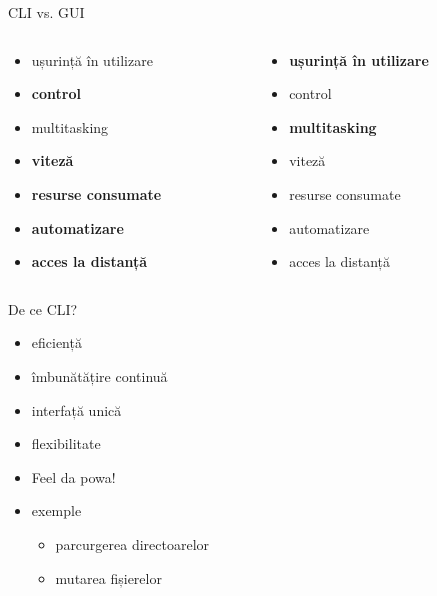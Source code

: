 \documentclass{beamer}
\begin{document}
\begin{frame}{CLI vs. GUI}
	\begin{columns}
		\begin{column}[l]{0.5\textwidth}
			\begin{itemize}
				\item ușurință în utilizare
				\item \textbf{control}
				\item multitasking
				\item \textbf{viteză}
				\item \textbf{resurse consumate}
				\item \textbf{automatizare}
				\item \textbf{acces la distanță}
			\end{itemize}
		\end{column}
		\begin{column}[l]{0.5\textwidth}
			\begin{itemize}
				\item \textbf{ușurință în utilizare}
				\item control
				\item \textbf{multitasking}
				\item viteză
				\item resurse consumate
				\item automatizare
				\item acces la distanță
			\end{itemize}
		\end{column}
	\end{columns}
\end{frame}

\begin{frame}{De ce CLI?}
	\begin{itemize}
		\item eficiență
		\item îmbunătățire continuă
		\item interfață unică
		\item flexibilitate
		\item Feel da powa!
		\item exemple
			\begin{itemize}
				\item parcurgerea directoarelor
				\item mutarea fișierelor
			\end{itemize}
	\end{itemize}
\end{frame}
\end{document}
